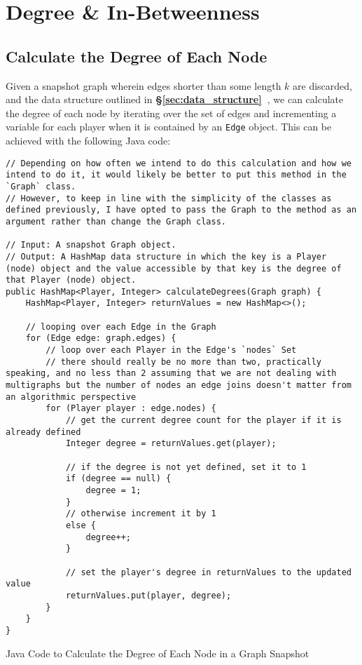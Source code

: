 \documentclass[a4paper,11pt]{article}
\newcommand{\secref}[1]{\textbf{§\ref{#1}~\nameref{#1}}}
\newenvironment{code}{\captionsetup{type=listing}}{}
\begin{document}
\section{Degree \& In-Betweenness}
\subsection{Calculate the Degree of Each Node}
Given a snapshot graph wherein edges shorter than some length $k$ are discarded, and the data structure outlined 
in \secref{sec:data_structure}, we can calculate the degree 
of each node by iterating over the set of edges and incrementing a variable for each player when it is contained 
by an \texttt{Edge} object.
This can be achieved with the following Java code:

\begin{code}
\begin{verbatim}
// Depending on how often we intend to do this calculation and how we intend to do it, it would likely be better to put this method in the `Graph` class.
// However, to keep in line with the simplicity of the classes as defined previously, I have opted to pass the Graph to the method as an argument rather than change the Graph class.

// Input: A snapshot Graph object.
// Output: A HashMap data structure in which the key is a Player (node) object and the value accessible by that key is the degree of that Player (node) object.
public HashMap<Player, Integer> calculateDegrees(Graph graph) {
    HashMap<Player, Integer> returnValues = new HashMap<>();

    // looping over each Edge in the Graph
    for (Edge edge: graph.edges) {
        // loop over each Player in the Edge's `nodes` Set
        // there should really be no more than two, practically speaking, and no less than 2 assuming that we are not dealing with multigraphs but the number of nodes an edge joins doesn't matter from an algorithmic perspective
        for (Player player : edge.nodes) {
            // get the current degree count for the player if it is already defined
            Integer degree = returnValues.get(player);

            // if the degree is not yet defined, set it to 1
            if (degree == null) {
                degree = 1;
            }
            // otherwise increment it by 1
            else {
                degree++;
            }

            // set the player's degree in returnValues to the updated value
            returnValues.put(player, degree);
        }
    }
}
\end{verbatim}
\caption{Java Code to Calculate the Degree of Each Node in a Graph Snapshot}
\end{code}
\end{document}
